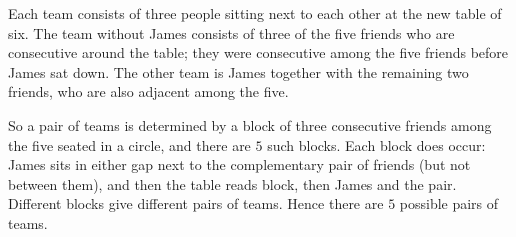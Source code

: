Each team consists of three people sitting next to each other at the new table of six. The team without James consists of three of the five friends who are consecutive around the table; they were consecutive among the five friends before James sat down. The other team is James together with the remaining two friends, who are also adjacent among the five.

So a pair of teams is determined by a block of three consecutive friends among the five seated in a circle, and there are $5$ such blocks. Each block does occur: James sits in either gap next to the complementary pair of friends (but not between them), and then the table reads block, then James and the pair. Different blocks give different pairs of teams. Hence there are $\boxed{5}$ possible pairs of teams.

